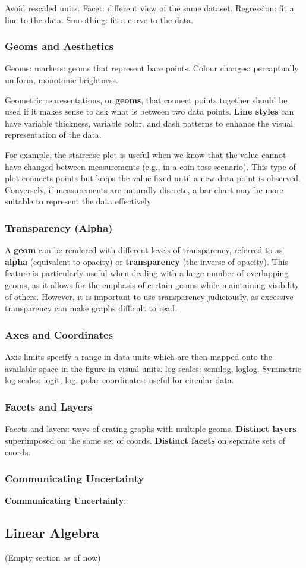 \documentclass{article}
\begin{document}
\noindent Avoid rescaled units. Facet: different view of the same dataset.  
Regression: fit a line to the data. Smoothing: fit a curve to the data.

\subsubsection*{Geoms and Aesthetics}
\noindent Geoms: markers: geoms that represent bare points.  
Colour changes: percaptually uniform, monotonic brightness.  

Geometric representations, or \textbf{geoms}, that connect points together should be used if it makes sense to ask what is between two data points.  
\textbf{Line styles} can have variable thickness, variable color, and dash patterns to enhance the visual representation of the data.  

\noindent For example, the staircase plot is useful when we know that the value cannot have changed between measurements (e.g., in a coin toss scenario).  
This type of plot connects points but keeps the value fixed until a new data point is observed.  
Conversely, if measurements are naturally discrete, a bar chart may be more suitable to represent the data effectively.

\subsubsection*{Transparency (Alpha)}
\noindent A \textbf{geom} can be rendered with different levels of transparency,
referred to as \textbf{alpha} (equivalent to opacity) or
\textbf{transparency} (the inverse of opacity).
This feature is particularly useful when dealing with a large number
of overlapping geoms, as it allows for the emphasis of certain geoms
while maintaining visibility of others.
However, it is important to use transparency judiciously, as excessive
transparency can make graphs difficult to read.

\subsubsection*{Axes and Coordinates}
\noindent Axis limits specify a range in data units which are then mapped onto the available space in the figure in visual units.  
\noindent log scales: semilog, loglog. Symmetric log scales: logit, log.  
\noindent polar coordinates: useful for circular data.

\subsubsection*{Facets and Layers}
\noindent Facets and layers: ways of crating graphs with multiple geoms.  
\textbf{Distinct layers} superimposed on the same set of coords.  
\textbf{Distinct facets} on separate sets of coords.

\subsubsection*{Communicating Uncertainty}
\noindent \textbf{Communicating Uncertainty}:


\subsection*{Linear Algebra}
\noindent (Empty section as of now)
\end{document}
